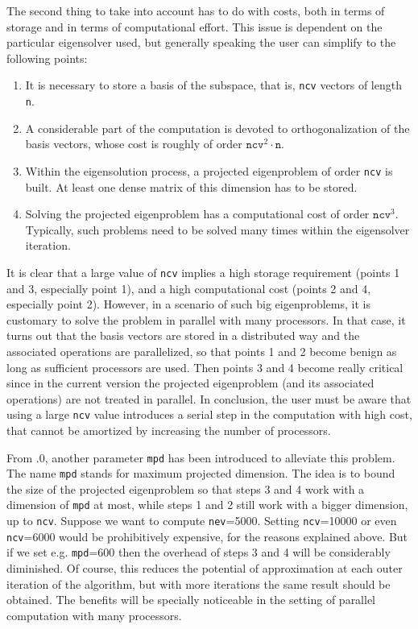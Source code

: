 The second thing to take into account has to do with costs, both in terms of storage and in terms of computational effort. This issue is dependent on the particular eigensolver used, but generally speaking the user can simplify to the following points:
\begin{enumerate}
\item It is necessary to store a basis of the subspace, that is, \texttt{ncv} vectors of length \texttt{n}.
\item A considerable part of the computation is devoted to orthogonalization of the basis vectors, whose cost is roughly of order $\mathtt{ncv}^2\cdot\mathtt{n}$.
\item Within the eigensolution process, a projected eigenproblem of order \texttt{ncv} is built. At least one dense matrix of this dimension has to be stored.
\item Solving the projected eigenproblem has a computational cost of order $\mathtt{ncv}^3$. Typically, such problems need to be solved many times within the eigensolver iteration.
\end{enumerate}

It is clear that a large value of \texttt{ncv} implies a high storage requirement (points 1 and 3, especially point 1), and a high computational cost (points 2 and 4, especially point 2). However, in a scenario of such big eigenproblems, it is customary to solve the problem in parallel with many processors. In that case, it turns out that the basis vectors are stored in a distributed way and the associated operations are parallelized, so that points 1 and 2 become benign as long as sufficient processors are used. Then points 3 and 4 become really critical since in the current \slepc version the projected eigenproblem (and its associated operations) are not treated in parallel. In conclusion, the user must be aware that using a large \texttt{ncv} value introduces a serial step in the computation with high cost, that cannot be amortized by increasing the number of processors. 

From .0, another parameter \texttt{mpd} has been introduced to alleviate this problem. The name \texttt{mpd} stands for maximum projected dimension. The idea is to bound the size of the projected eigenproblem so that steps 3 and 4 work with a dimension of \texttt{mpd} at most, while steps 1 and 2 still work with a bigger dimension, up to \texttt{ncv}. Suppose we want to compute \texttt{nev}=5000. Setting \texttt{ncv}=10000 or even \texttt{ncv}=6000 would be prohibitively expensive, for the reasons explained above. But if we set e.g. \texttt{mpd}=600 then the overhead of steps 3 and 4 will be considerably diminished. Of course, this reduces the potential of approximation at each outer iteration of the algorithm, but with more iterations the same result should be obtained. The benefits will be specially noticeable in the setting of parallel computation with many processors.

